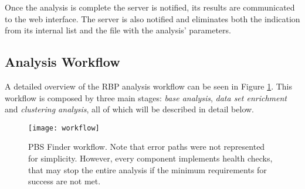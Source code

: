 Once the analysis is complete the server is notified, its results are
communicated to the web interface. The server is also notified and eliminates
both the indication from its internal list and the file with the analysis'
parameters.


\subsection{Analysis Workflow}


A detailed overview of the RBP analysis workflow can be seen in Figure
\ref{fig:workflow}. This workflow is composed by three main stages: \emph{base
analysis}, \emph{data set enrichment} and \emph{clustering analysis}, all of
which will be described in detail below.

\begin{figure}[!htb]
  \begin{center}
    \leavevmode
    \texttt{[image: workflow]}
    \caption[PBS Finder workflow]{
      PBS Finder workflow. Note that error paths were not represented for
      simplicity. However, every component implements health checks, that may
      stop the entire analysis if the minimum requirements for success are not
      met.
    }
    \label{fig:workflow}
  \end{center}
\end{figure}


